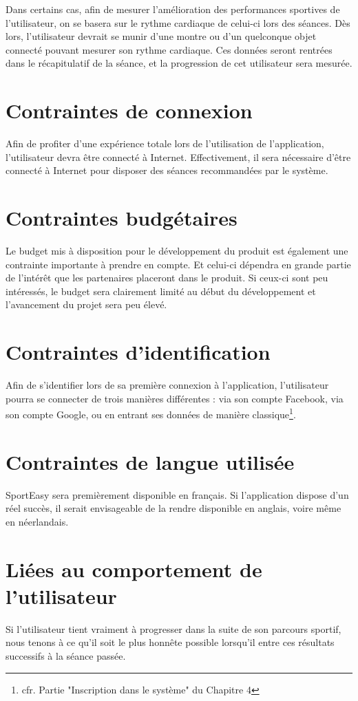 Dans certains cas, afin de mesurer l'amélioration des performances sportives de l'utilisateur, on se basera sur le rythme cardiaque de celui-ci lors des séances. Dès lors, l'utilisateur devrait se munir d'une montre ou d'un quelconque objet connecté pouvant mesurer son rythme cardiaque. Ces données seront rentrées dans le récapitulatif de la séance, et la progression de cet utilisateur sera mesurée.

\section{Contraintes de connexion}

Afin de profiter d'une expérience totale lors de l'utilisation de l'application, l'utilisateur devra être connecté à Internet. Effectivement, il sera nécessaire d'être connecté à Internet pour disposer des séances recommandées par le sys\-tè\-me.

\section{Contraintes budgétaires}

Le budget mis à disposition pour le développement du produit est également une contrainte importante à prendre en compte. Et celui-ci dépendra en grande partie de l'intérêt que les partenaires placeront dans le produit. Si ceux-ci sont peu intéressés, le budget sera clairement limité au début du développement et l'avancement du projet sera peu élevé.

\section{Contraintes d'identification}

Afin de s'identifier lors de sa première connexion à l'application, l'utilisateur pourra se connecter de trois manières différentes : via son compte Facebook, via son compte Google, ou en entrant ses données de manière classique\footnote{cfr. Partie "Inscription dans le système" du Chapitre 4}. 

\section{Contraintes de langue utilisée}

SportEasy sera premièrement disponible en français. Si l'application dispose d'un réel succès, il serait envisageable de la rendre disponible en anglais, voire même en néerlandais.

\section{Liées au comportement de l'utilisateur}

Si l'utilisateur tient vraiment à progresser dans la suite de son parcours sportif, nous tenons à ce qu'il soit le plus honnête possible lorsqu'il entre ces résultats successifs à la séance passée. 